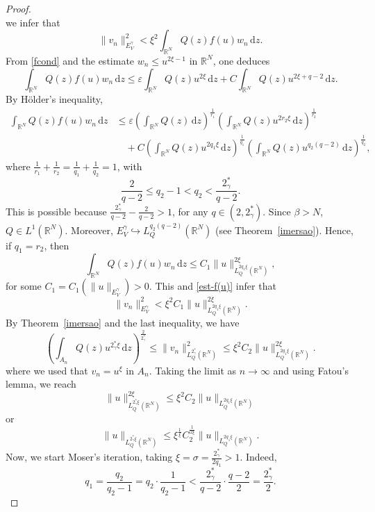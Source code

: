 \documentclass[10pt,a4paper]{amsart}
\newcommand{\R}{\mathbb{R}}
\begin{document}
\begin{proof}
$$	$$	
	we infer that
\begin{equation}\label{est-f(u)}
		\|v_n\|_{E_V^\gamma}^2 <\xi^2	 \int_{\R^N}Q(z)f(u)w_n\,\mathrm{d}z.
	\end{equation}
    From \eqref{fcond} and the estimate $w_n \leq u^{2\xi-1}$ in $\mathbb{R}^N$, one deduces
$$
	\int_{\R^N}Q(z)f(u)w_n\,\mathrm{d}z \leq \varepsilon\int_{\mathbb{R}^N}Q(z)u^{2\xi}\,\mathrm{d}z + C\int_{\mathbb{R}^N}Q(z)u^{2\xi+q-2}\,\mathrm{d}z.
	$$ 
    By H\"older's inequality,
	$$
	\begin{aligned}
		\int_{\R^N}Q(z)f(u)w_n\,\mathrm{d}z &\leq \varepsilon\left(\int_{\mathbb{R}^N}Q(z)\,\mathrm{d}z\right)^{\frac{1}{r_1}}\left(\int_{\mathbb{R}^N}Q(z)u^{2r_2\xi}\,\mathrm{d}z\right)^{\frac{1}{r_2}}
		\\
		&\quad + C\left(\int_{\mathbb{R}^N}Q(z)u^{2q_1\xi}\,\mathrm{d}z\right)^{\frac{1}{q_1}}\left(\int_{\mathbb{R}^N}Q(z)u^{q_2(q-2)}\,\mathrm{d}z\right)^{\frac{1}{q_2}},
	\end{aligned}
	$$	
	where $\frac{1}{r_1} + \frac{1}{r_2} =  \frac{1}{q_1} + \frac{1}{q_2}=1$, with 
$$
	\frac{2}{q-2}\leq q_2-1< q_2< \frac{2_\gamma^*}{q-2}.
	$$
	This is possible because $\frac{2_\gamma^*}{q-2} - \frac{2}{q-2}>1$, for any $q\in(2,2_\gamma^*)$. Since $\beta>N$, $Q\in L^1(\mathbb{R}^N)$. Moreover, $E_V^\gamma \hookrightarrow L_Q^{q_2(q-2)}(\mathbb{R}^N)$ (see Theorem~\ref{imersao}). Hence, if $q_1=r_2$, then
	$$
	\int_{\R^N}Q(z)f(u)w_n\,\mathrm{d}z \leq C_1\|u\|_{L^{2q_1\xi}_Q(\mathbb{R}^N)}^{2\xi},
	$$
	for some $C_1=C_1(\|u\|_{E^\gamma_V})>0$. This and \eqref{est-f(u)} infer that 
	$$
	\|v_n\|_{E_V^\gamma}^2 <\xi^2C_1\|u\|_{L^{2q_1\xi}_Q(\mathbb{R}^N)}^{2\xi}.
	$$
By Theorem~\ref{imersao} and the last inequality, we have
	$$
\left(\int_{A_n}Q(z)u^{2_\gamma^*\xi}\,\mathrm{d}z\right)^{\frac{2}{2_\gamma^*}}\leq\|v_n\|_{L^{2_\gamma^*}_Q(\mathbb{R}^N)}^2 \leq \xi^2C_2\|u\|_{L^{2q_1\xi}_Q(\mathbb{R}^N)}^{2\xi}.
	$$
where we used that $v_n=u^\xi$ in $A_n$. Taking the limit as $n\to \infty$ and using Fatou’s lemma, we reach
	$$
	\|u\|_{L^{2_\gamma^*\xi}_Q(\mathbb{R}^N)}^{2\xi} \leq \xi^2C_2\|u\|_{L^{2q_1\xi}_Q(\mathbb{R}^N)} 
	$$
    or
	\begin{equation}\label{inicial-ite-moser}
		\|u\|_{L^{2_\gamma^*\xi}_Q(\mathbb{R}^N)} \leq \xi^{\frac{1}{\xi}} C_2^{\frac{1}{2\xi}}\|u\|_{L^{2q_1\xi}_Q(\mathbb{R}^N)}.
	\end{equation}
Now, we start Moser's iteration, taking $\xi=\sigma= \frac{2_\gamma^*}{2q_1}>1$. Indeed,
	$$
	q_1=\frac{q_2}{q_2-1}=q_2\cdot\frac{1}{q_2-1}<\frac{2_\gamma^*}{q-2}\cdot \frac{q-2}{2} = \frac{2_\gamma^*}{2}.
$$
\end{proof}
\end{document}
